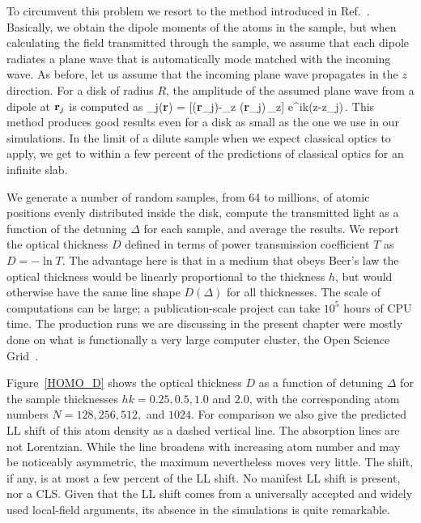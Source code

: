 To circumvent this problem we resort to the method introduced in Ref.~\cite{1367-2630-14-5-055001}. Basically, we obtain the dipole moments of the atoms in the sample, but when calculating the field transmitted through the sample, we assume that each dipole radiates a plane wave that is automatically mode matched with the incoming wave. As before, let us assume that the incoming plane wave propagates in the $z$ direction. For a disk of radius $R$, the amplitude of the assumed plane wave from a dipole at ${\bf r}_j$ is computed as
\beq
\bE_j({\bf r}) =  [\bd({\bf r}_j)-_z \cdot\bd({\bf r}_j)\,_z] e^{ik(z-z_j)}\,.
\label{TRLIGHT}
\eeq
This method produces good results even for a disk as small as the one we use in our simulations. In the limit of a dilute sample when we expect classical optics to apply, we get to within a few percent of the predictions of classical optics for an infinite slab.

We generate a number of random samples, from 64 to millions, of atomic positions evenly distributed inside the disk, compute the transmitted light as a function of the detuning $\Delta$ for each sample, and average the results. We report the optical thickness $D$ defined in terms of power transmission coefficient $T$ as $D=-\ln T$. The advantage here is that in a medium that obeys Beer's law the optical thickness would be linearly proportional to the thickness $h$, but would otherwise have the same line shape $D(\Delta)$ for all thicknesses. The scale of computations can be large; a publication-scale project can take $10^5$ hours of CPU time. The production runs we are discussing in the present chapter were mostly done on what is functionally a very large computer cluster, the Open Science Grid~\cite{OSG}.

Figure~\ref{HOMO_D} shows the optical thickness $D$ as a function of detuning $\Delta$ for the sample thicknesses $hk=0.25, 0.5, 1.0$ and $2.0$, with the corresponding atom numbers $N=128, 256, 512,$ and $1024$. For comparison we also give the predicted LL shift of this atom density as a dashed vertical line. The absorption lines are not Lorentzian. While the line broadens with increasing atom number and may be noticeably asymmetric, the maximum nevertheless moves very little. The shift, if any, is at most a few percent of the LL shift. No manifest LL shift is present, nor a CLS. Given that the LL shift comes from a universally accepted and widely used local-field arguments, its absence in the simulations is quite remarkable.


